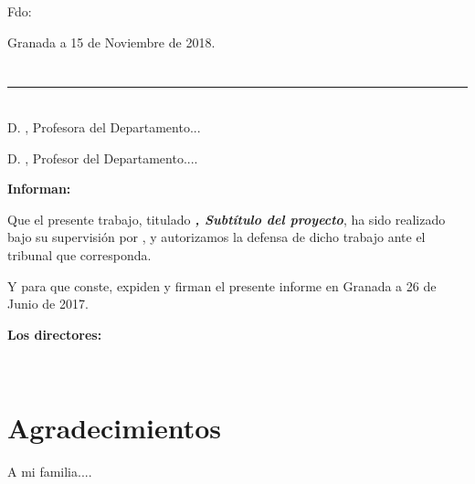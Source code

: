 \vspace{6cm}

\noindent Fdo: \myName

\vspace{2cm}

\begin{flushright}
Granada a 15 de Noviembre de 2018.
\end{flushright}


\chapter*{}
\thispagestyle{empty}

\noindent\rule[-1ex]{\textwidth}{2pt}\\[4.5ex]

D. \textbf{\myProf}, Profesora del Departamento...

\vspace{0.5cm}

D. \textbf{\myOtherProf}, Profesor del Departamento....


\vspace{0.5cm}

\textbf{Informan:}

\vspace{0.5cm}

Que el presente trabajo, titulado \textit{\textbf{\myTitle , Subtítulo del proyecto}},
ha sido realizado bajo su supervisión por \textbf{\myName}, y autorizamos la defensa de dicho trabajo ante el tribunal que corresponda.

\vspace{0.5cm}

Y para que conste, expiden y firman el presente informe en Granada a 26 de Junio de 2017.

\vspace{1cm}

\textbf{Los directores:}

\vspace{5cm}

\noindent \textbf{\myProf \ \ \ \ \ \myOtherProf}

\chapter*{Agradecimientos}
\thispagestyle{empty}

       \vspace{1cm}


A mi familia....

